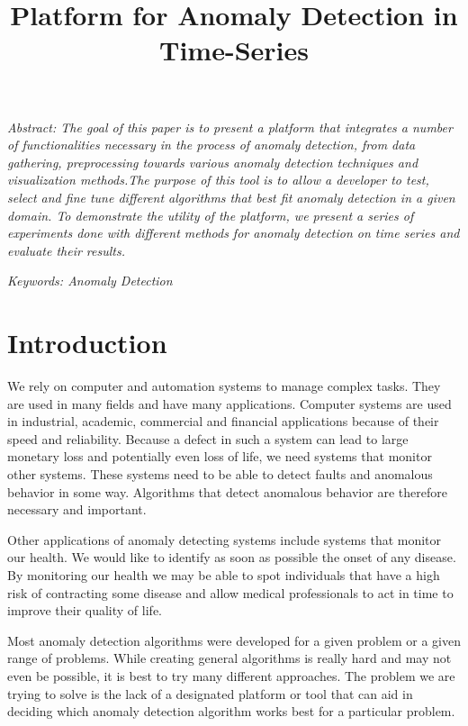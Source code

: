 \documentclass[a4paper, 10pt]{article}
\title{\huge Platform for Anomaly Detection in Time-Series}
\begin{document}
\maketitle

\noindent \hrulefill

\small
\textit{
Abstract: The goal of this paper is to present a platform that integrates a number of functionalities necessary in the process of anomaly detection, from data gathering, preprocessing towards various anomaly detection techniques and visualization methods.The purpose of this tool is to allow a developer to test, select and fine tune different algorithms that best fit anomaly detection in a given domain. To demonstrate the utility of the platform, we present a series of experiments done with different methods for anomaly detection on time series and evaluate their results.
}

\noindent \hrulefill

\textit{
Keywords: Anomaly Detection
}

\normalsize

\section{Introduction}

We rely on computer and automation systems to manage complex tasks. They are used in many fields and have many applications. Computer systems are used in industrial, academic, commercial and financial applications because of their speed and reliability. Because a defect in such a system can lead to large monetary loss and potentially even loss of life, we need systems that monitor other systems. These systems need to be able to detect faults and anomalous behavior in some way. Algorithms that detect anomalous behavior are therefore necessary and important.

Other applications of anomaly detecting systems include systems that monitor our health. We would like to identify as soon as possible the onset of any disease. By monitoring our health we may be able to spot individuals that have a high risk of contracting some disease and allow medical professionals to act in time to improve their quality of life.

Most anomaly detection algorithms were developed for a given problem or a given range of problems. While creating general algorithms is really hard and may not even be possible, it is best to try many different approaches. The problem we are trying to solve is the lack of a designated platform or tool that can aid in deciding which anomaly detection algorithm works best for a particular problem.
\end{document}
